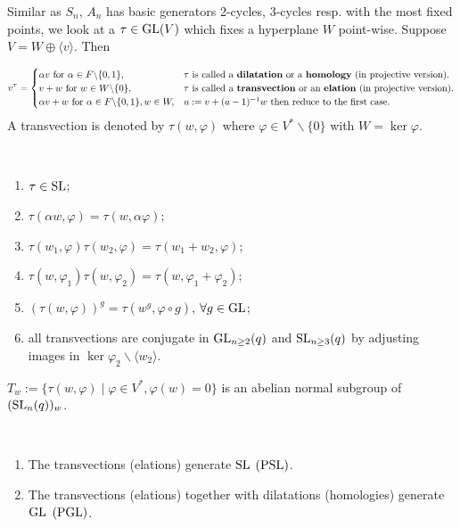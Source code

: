 \documentclass[a4paper,11pt]{article}
\begin{document}
Similar as $S_n$, $A_n$ has basic generators 2-cycles, 3-cycles resp. with the most fixed points, we look at a $\tau\in \mathrm{GL}(V)$ which fixes a hyperplane $W$ point-wise. Suppose $V=W\oplus\langle v\rangle$. Then 

\begin{definition}
\begin{equation*}
    v^\tau=\begin{cases}
    \alpha v \text{ for }\alpha\in F\backslash\{0,1\}, & \tau\text{ is called a \textbf{dilatation} or a \textbf{homology} (in projective version).}\\
    v+w \text{ for } w\in W\backslash \{0\}, & \tau\text{ is called a \textbf{transvection} or an \textbf{elation} (in projective version).}\\
    \alpha v+w \text{ for }\alpha\in F\backslash\{0,1\}, w\in W, & u:=v+(a-1)^{-1}w \text{ then reduce to the first case.}
    \end{cases}
\end{equation*}
A transvection is denoted by $\tau(w,\varphi)$ where $\varphi\in V^*\backslash \{0\}$ with $W=\ker \varphi$.
\end{definition}

\begin{lemma}\ 
    \begin{enumerate}
        \item $\tau\in \mathrm{SL}$;
        \item $\tau(\alpha w,\varphi)=\tau(w,\alpha\varphi)$;
        \item $\tau(w_1,\varphi)\tau(w_2,\varphi)=\tau(w_1+w_2,\varphi)$;
        \item $\tau(w,\varphi_1)\tau(w,\varphi_2)=\tau(w,\varphi_1+\varphi_2)$;
        \item $(\tau(w,\varphi))^g=\tau(w^g,\varphi\circ g)$, $\forall g\in \mathrm{GL}$;
        \item all transvections are conjugate in $\mathrm{GL}_{n\geq 2}(q)$ and $\mathrm{SL}_{n\geq 3}(q)$ by adjusting images in $\ker\varphi_2\backslash\langle w_2\rangle$.
    \end{enumerate}
\end{lemma}

\begin{lemma}\label{abelian normal subgroup}
    $T_w:=\{\tau(w,\varphi)\mid \varphi\in V^*, \varphi(w)=0\}$ is an abelian normal subgroup of $(\mathrm{SL}_n(q))_w$.
\end{lemma}

\begin{lemma}\label{generating}\ 
    \begin{enumerate}[itemsep=0pt,label=\roman*.]
        \item The transvections (elations) generate $\mathrm{SL}$ $(\mathrm{PSL})$.
        \item The transvections (elations) together with dilatations (homologies) generate $\mathrm{GL}$ $(\mathrm{PGL})$.
    \end{enumerate}
\end{lemma}
\end{document}

